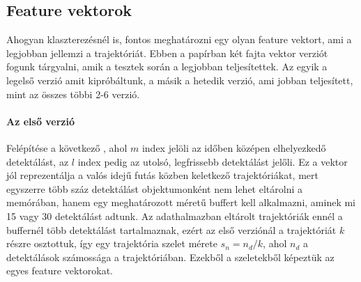 \documentclass[12pt,a4paper]{article}
\begin{document}
\subsection{Feature vektorok}
Ahogyan klaszterezésnél is, fontos meghatározni egy olyan feature vektort, ami a legjobban jellemzi a trajektóriát. Ebben a papírban
két fajta vektor verziót fogunk tárgyalni, amik a tesztek során a legjobban teljesítettek. Az egyik a legelső verzió amit kipróbáltunk,
a másik a hetedik verzió, ami jobban teljesített, mint az összes többi 2-6 verzió.
\paragraph{Az első verzió} Felépítése a következő \begin{math}[x_0, y_0, v_{x_0}, v_{y_0}, x_m, y_m, x_l, y_l, v_{x_l}, v_{y_l}]\end{math}, ahol \begin{math}m\end{math}
index jelöli az időben középen elhelyezkedő detektálást, az \begin{math}l\end{math} index pedig az utolsó, legfrissebb detektálást jelőli.
Ez a vektor jól reprezentálja a valós idejű futás közben keletkező trajektóriákat, mert egyszerre több száz detektálást objektumonként
nem lehet eltárolni a memórában, hanem egy meghatározott méretű buffert kell alkalmazni, aminek mi 15 vagy 30 detektálást adtunk.
Az adathalmazban eltárolt trajektóriák ennél a buffernél több detektálást tartalmaznak, ezért az első verziónál a trajektóriát \begin{math}k\end{math}
részre osztottuk, így egy trajektória szelet mérete \begin{math}s_n = n_d/k\end{math}, ahol \begin{math}n_d\end{math} a detektálások számossága
a trajektóriában. Ezekből a szeletekből képeztük az egyes feature vektorokat.
\end{document}
